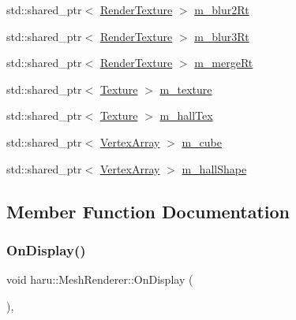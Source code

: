 \begin{DoxyCompactItemize}
\item 
std\+::shared\+\_\+ptr$<$ \mbox{\hyperlink{classharu_1_1_render_texture}{Render\+Texture}} $>$ \mbox{\hyperlink{classharu_1_1_mesh_renderer_a7e980792681d9b28915b27f46dfa99ac}{m\+\_\+blur2\+Rt}}
\item 
std\+::shared\+\_\+ptr$<$ \mbox{\hyperlink{classharu_1_1_render_texture}{Render\+Texture}} $>$ \mbox{\hyperlink{classharu_1_1_mesh_renderer_a457ee3e43f876531601198f3a2a11363}{m\+\_\+blur3\+Rt}}
\item 
std\+::shared\+\_\+ptr$<$ \mbox{\hyperlink{classharu_1_1_render_texture}{Render\+Texture}} $>$ \mbox{\hyperlink{classharu_1_1_mesh_renderer_a5cfa897f6d0aeb687f1b6e091c6c079e}{m\+\_\+merge\+Rt}}
\item 
std\+::shared\+\_\+ptr$<$ \mbox{\hyperlink{classharu_1_1_texture}{Texture}} $>$ \mbox{\hyperlink{classharu_1_1_mesh_renderer_abea78715a7752ce3ea0311f89ffcbbc9}{m\+\_\+texture}}
\item 
std\+::shared\+\_\+ptr$<$ \mbox{\hyperlink{classharu_1_1_texture}{Texture}} $>$ \mbox{\hyperlink{classharu_1_1_mesh_renderer_a9c59297b0cbcc1e13adfdebbb6edcdcd}{m\+\_\+hall\+Tex}}
\item 
std\+::shared\+\_\+ptr$<$ \mbox{\hyperlink{classharu_1_1_vertex_array}{Vertex\+Array}} $>$ \mbox{\hyperlink{classharu_1_1_mesh_renderer_a8911a9066c7d9ddbf87126d5dccb2246}{m\+\_\+cube}}
\item 
std\+::shared\+\_\+ptr$<$ \mbox{\hyperlink{classharu_1_1_vertex_array}{Vertex\+Array}} $>$ \mbox{\hyperlink{classharu_1_1_mesh_renderer_a84b8747803ab80c6b1f827f7c8c2ac5a}{m\+\_\+hall\+Shape}}
\end{DoxyCompactItemize}


\subsection{Member Function Documentation}
\mbox{\label{classharu_1_1_mesh_renderer_ac927c9cc1d392ca8305ca995ddc0b7a6}} 
\subsubsection{\texorpdfstring{On\+Display()}{OnDisplay()}}
{\footnotesize\ttfamily void haru\+::\+Mesh\+Renderer\+::\+On\+Display (\begin{DoxyParamCaption}{ }\end{DoxyParamCaption})\hspace{0.3cm}{\ttfamily [private]}, {\ttfamily [virtual]}}




